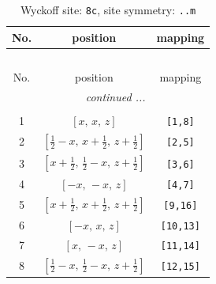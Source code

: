 \documentclass[fleqn,8pt]{jsarticle}
\begin{document}
\renewcommand{\arraystretch}{1.2}
\begin{longtable}{ccc}
\caption{Wyckoff site: {\tt 8c}, site symmetry: {\tt ..m}}
 \\
 \hline \hline
No. & position & mapping \\ \hline \endfirsthead

\multicolumn{2}{l}{\tablename\ \thetable{}} \\
 \hline \hline
No. & position & mapping \\ \hline \endhead

 \hline \hline
\multicolumn{2}{r}{\footnotesize\it continued ...} \\ \endfoot

 \hline \hline
\multicolumn{2}{r}{} \\ \endlastfoot

1 & $\left[ x,\, x,\, z \right]$ & {\tt [1,8]} \\ \hline
2 & $\left[ \frac{1}{2} - x,\, x + \frac{1}{2},\, z + \frac{1}{2} \right]$ & {\tt [2,5]} \\ \hline
3 & $\left[ x + \frac{1}{2},\, \frac{1}{2} - x,\, z + \frac{1}{2} \right]$ & {\tt [3,6]} \\ \hline
4 & $\left[ - x,\, - x,\, z \right]$ & {\tt [4,7]} \\ \hline
5 & $\left[ x + \frac{1}{2},\, x + \frac{1}{2},\, z + \frac{1}{2} \right]$ & {\tt [9,16]} \\ \hline
6 & $\left[ - x,\, x,\, z \right]$ & {\tt [10,13]} \\ \hline
7 & $\left[ x,\, - x,\, z \right]$ & {\tt [11,14]} \\ \hline
8 & $\left[ \frac{1}{2} - x,\, \frac{1}{2} - x,\, z + \frac{1}{2} \right]$ & {\tt [12,15]} \\
\end{longtable}
\renewcommand{\arraystretch}{1.2}
\end{document}

